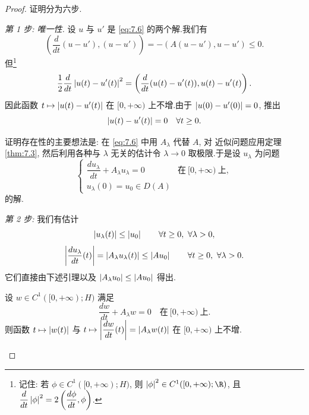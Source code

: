 \begin{proof}
证明分为六步.

\emph{第 1 步: 唯一性.} 设 $u$ 与 $u'$ 是 \eqref{eq:7.6} 的两个解.我们有
\begin{equation*}
\left(\frac{d}{dt}(u-u'),(u-u')\right)
=-(A(u-u'),u-u')\le0.
\end{equation*}
但\footnote{记住: 若 $\phi\in C^1([0,+\infty);H)$, 则
$\abs{\phi}^2\in C^1([0,+\infty);\R)$, 且
$\dfrac{d}{dt}\left|\phi\right|^2=2\left(\dfrac{d\phi}{dt},\phi\right)$.}
\begin{equation*}
\frac12\frac{d}{dt}\left|u(t)-u'(t)\right|^2
=\left(\frac{d}{dt}(u(t)-u'(t)),u(t)-u'(t)\right).
\end{equation*}
因此函数 $t\mapsto\left|u(t)-u'(t)\right|$ 在 $[0,+\infty)$ 上不增.由于
$\left|u(0)-u'(0)\right|=0$, 推出
\begin{equation*}
\left|u(t)-u'(t)\right|=0\quad\forall t\ge0.
\end{equation*}

证明存在性的主要想法是: 在 \eqref{eq:7.6} 中用 $A_\lambda$ 代替 $A$, 对
近似问题应用定理  \ref{thm:7.3}, 然后利用各种与 $\lambda$ 无关的估计令
$\lambda\to0$ 取极限.于是设 $u_\lambda$ 为问题
\begin{equation}
\begin{cases}
\dfrac{du_\lambda}{dt}+A_\lambda u_\lambda=0
& \text{在}\ [0,+\infty)\ \text{上},\\
u_\lambda(0)=u_0\in D(A)
\end{cases}
\label{eq:7.7}
\end{equation}
的解.

\emph{第 2 步:} 我们有估计
\begin{equation}
\left|u_\lambda(t)\right|\le\left|u_0\right|
\qquad\forall t\ge0,\ \forall\lambda>0,
\label{eq:7.8}
\end{equation}
\begin{equation}
\left|\frac{du_\lambda}{dt}(t)\right|=\left|A_\lambda u_\lambda(t)\right|
\le\left|Au_0\right|
\qquad\forall t\ge0,\ \forall\lambda>0.
\label{eq:7.9}
\end{equation}
它们直接由下述引理以及 $\left|A_\lambda u_0\right|\le\left|Au_0\right|$ 得出.

\begin{lemma}
\label{lem:7.1}
设 $w\in C^1([0,+\infty);H)$ 满足
\begin{equation}
\frac{dw}{dt}+A_\lambda w=0\quad\text{在}\ [0,+\infty)\ \text{上}.
\label{eq:7.10}
\end{equation}
则函数 $t\mapsto\left|w(t)\right|$ 与 $t\mapsto
\left|\dfrac{dw}{dt}(t)\right|=\left|A_\lambda w(t)\right|$ 在 $[0,+\infty)$ 上不增.
\end{lemma}


\end{proof}
